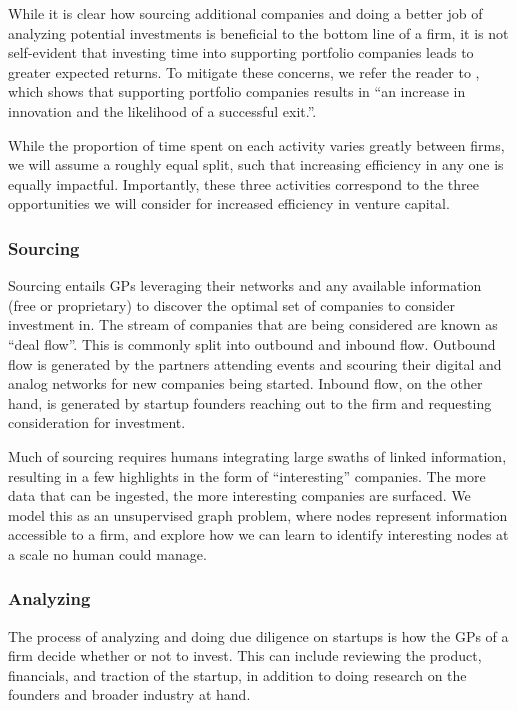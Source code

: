 While it is clear how sourcing additional companies and doing a better job of analyzing potential investments is beneficial to the bottom line of a firm, it is not self-evident that investing time into supporting portfolio companies leads to greater expected returns. To mitigate these concerns, we refer the reader to \cite{JOFI:JOFI12370}, which shows that supporting portfolio companies results in ``an increase in innovation and the likelihood of a successful exit.''.


While the proportion of time spent on each activity varies greatly between firms, we will assume a roughly equal split, such that increasing efficiency in any one is equally impactful. Importantly, these three activities correspond to the three opportunities we will consider for increased efficiency in venture capital.

\subsubsection{Sourcing}

Sourcing entails GPs leveraging their networks and any available information (free or proprietary) to discover the optimal set of companies to consider investment in. The stream of companies that are being considered are known as ``deal flow''. This is commonly split into outbound and inbound flow. Outbound flow is generated by the partners attending events and scouring their digital and analog networks for new companies being started. Inbound flow, on the other hand, is generated by startup founders reaching out to the firm and requesting consideration for investment.

Much of sourcing requires humans integrating large swaths of linked information, resulting in a few highlights in the form of ``interesting'' companies. The more data that can be ingested, the more interesting companies are surfaced. We model this as an unsupervised graph problem, where nodes represent information accessible to a firm, and explore how we can learn to identify interesting nodes at a scale no human could manage.

\subsubsection{Analyzing}

The process of analyzing and doing due diligence on startups is how the GPs of a firm decide whether or not to invest. This can include reviewing the product, financials, and traction of the startup, in addition to doing research on the founders and broader industry at hand.

